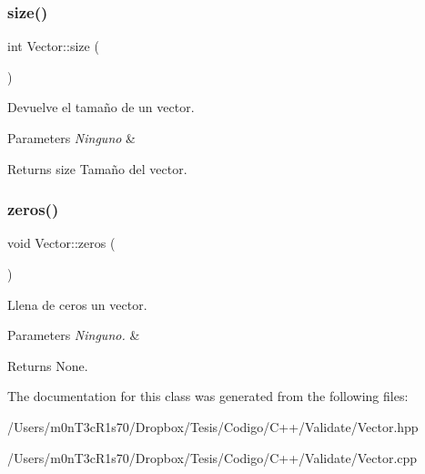\subsubsection{\texorpdfstring{size()}{size()}}
{\footnotesize\ttfamily int Vector\+::size (\begin{DoxyParamCaption}{ }\end{DoxyParamCaption})\hspace{0.3cm}{\ttfamily [inline]}}



Devuelve el tamaño de un vector. 


\begin{DoxyParams}{Parameters}
{\em Ninguno} & \\
\hline
\end{DoxyParams}
\begin{DoxyReturn}{Returns}
size Tamaño del vector. 
\end{DoxyReturn}
\hypertarget{class_vector_a3279c16a264024cf6eb49e6d4cef5ad5}{}\label{class_vector_a3279c16a264024cf6eb49e6d4cef5ad5} 
\subsubsection{\texorpdfstring{zeros()}{zeros()}}
{\footnotesize\ttfamily void Vector\+::zeros (\begin{DoxyParamCaption}{ }\end{DoxyParamCaption})}



Llena de ceros un vector. 


\begin{DoxyParams}{Parameters}
{\em Ninguno.} & \\
\hline
\end{DoxyParams}
\begin{DoxyReturn}{Returns}
None. 
\end{DoxyReturn}


The documentation for this class was generated from the following files\+:\begin{DoxyCompactItemize}
\item 
/\+Users/m0n\+T3c\+R1s70/\+Dropbox/\+Tesis/\+Codigo/\+C++/\+Validate/Vector.\+hpp\item 
/\+Users/m0n\+T3c\+R1s70/\+Dropbox/\+Tesis/\+Codigo/\+C++/\+Validate/Vector.\+cpp\end{DoxyCompactItemize}

